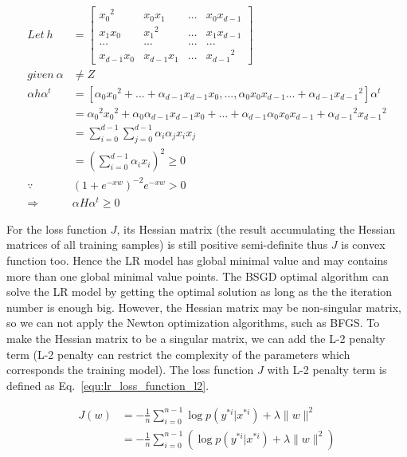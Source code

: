 \documentclass[runningheads,openany]{xhlPaper}
\begin{document}
\begin{equation}
\label{equ:lr_half_positive_semi_definite_proof}
\begin{aligned}
Let\ h &= \left[ {\begin{array}{*{20}{c}}
{{x_0}^2}&{{x_0}{x_1}}&{...}&{{x_0}{x_{d - 1}}}\\
{{x_1}{x_0}}&{{x_1}^2}&{...}&{{x_1}{x_{d - 1}}}\\
{...}&{...}&{...}&{...}\\
{{x_{d - 1}}{x_0}}&{{x_{d - 1}}{x_1}}&{...}&{{x_{d - 1}}^2}
\end{array}} \right]\\
given\ \alpha  &\ne Z\\
\alpha h{\alpha ^t} &= \left[ {{\alpha _0}{x_0}^2 + ... + {\alpha _{d - 1}}{x_{d - 1}}{x_0},...,{\alpha _0}{x_0}{x_{d - 1}}... + {\alpha _{d - 1}}{x_{d - 1}}^2} \right]{\alpha ^t}\\
 &= {\alpha _0}^2{x_0}^2 + {\alpha _0}{\alpha _{d - 1}}{x_{d - 1}}{x_0} + ... + {\alpha _{d - 1}}{\alpha _0}{x_0}{x_{d - 1}} + {\alpha _{d - 1}}^2{x_{d - 1}}^2\\
 &= \sum\limits_{i = 0}^{d - 1} {\sum\limits_{j = 0}^{d - 1} {{\alpha _i}{\alpha _j}{x_i}{x_j}} } \\
 &= {\left( {\sum\limits_{i = 0}^{d - 1} {{\alpha _i}{x_i}} } \right)^2} \ge 0\\
 \because \quad &{\left( {1 + {e^{ - xw}}} \right)^{ - 2}}{e^{ - xw}} > 0\\
 \Rightarrow \quad &\alpha H{\alpha ^t} \ge 0
\end{aligned}
\end{equation}

For the loss function $J$, its Hessian matrix (the result accumulating the Hessian matrices of all training samples) is still positive semi-definite thus $J$ is convex function too. 
Hence the LR model has global minimal value and may contains more than one global minimal value points.
The BSGD optimal algorithm can solve the LR model by getting the optimal solution as long as the the iteration number is enough big.
However, the Hessian matrix may be non-singular matrix, so we can not apply the Newton optimization algorithms, such as BFGS. 
To make the Hessian matrix to be a singular matrix, we can add the L-2 penalty term (L-2 penalty can restrict the complexity of the parameters which corresponds the training model).
The loss function $J$ with L-2 penalty term is defined as Eq.~\ref{equ:lr_loss_function_l2}.

\begin{equation}
\label{equ:lr_loss_function_l2}
\begin{aligned}
J\left( w \right) &=  - \frac{1}{n}\sum\limits_{i = 0}^{n - 1} {\log p\left( {{y^{*i}}|{x^{*i}}} \right)}  + \lambda \parallel w{\parallel ^2}\\
 &=  - \frac{1}{n}\sum\limits_{i = 0}^{n - 1} {\left( {\log p\left( {{y^{*i}}|{x^{*i}}} \right) + \lambda \parallel w{\parallel ^2}} \right)} 
\end{aligned}
\end{equation}
\end{document}
